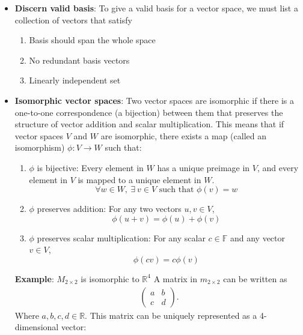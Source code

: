 \documentclass{report}
\begin{document}
\begin{itemize}
        \item \textbf{Discern valid basis}: To give a valid basis for a vector space, we must list a collection of vectors that satisfy
            \begin{enumerate}
                \item Basis should span the whole space
                \item No redundant basis vectors
                \item Linearly independent set
            \end{enumerate}
        \item \textbf{Isomorphic vector spaces}:
            Two vector spaces are isomorphic if there is a one-to-one correspondence (a bijection) between them that preserves the structure of vector addition and scalar multiplication. This means that if vector spaces $V$ and $W$ are isomorphic, there exists a map (called an isomorphism) $\phi: V \to W$ such that:
            \begin{enumerate}
                \item $\phi$ is bijective: Every element in $W$ has a unique preimage in $V$, and every element in $V$ is mapped to a unique element in $W$.
                \[
                    \forall w \in W, \ \exists\ v \in V \text{ such that } \phi(v) = w
                \]
                \item $\phi$ preserves addition: For any two vectors $u, v \in V$,
                \[
                    \phi(u + v) = \phi(u) + \phi(v)
                \]
                \item $\phi$ preserves scalar multiplication: For any scalar $c \in \mathbb{F}$ and any vector $v \in V$,
                \[
                    \phi(cv) = c\phi(v)
                \]
            \end{enumerate}
            \bigbreak \noindent 
            \textbf{Example}: $M_{2\times 2}$ is isomorphic to $\mathbb{R}^{4} $
            \bigbreak \noindent 
            A matrix in $m_{2\times 2}$ can be written as 
            \begin{align*}
                \begin{pmatrix} a & b \\ c & d \end{pmatrix}
            .\end{align*}
            Where $a,b,c,d \in \mathbb{R}$. This matrix can be uniquely represented as a 4-dimensional vector:
            \begin{align*}

\end{align*}
\end{itemize}
\end{document}
